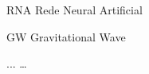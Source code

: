\begin{siglas}
  \item[RNA] Rede Neural Artificial	
  \item[GW] Gravitational Wave
  \item[...] \ldots
\end{siglas}